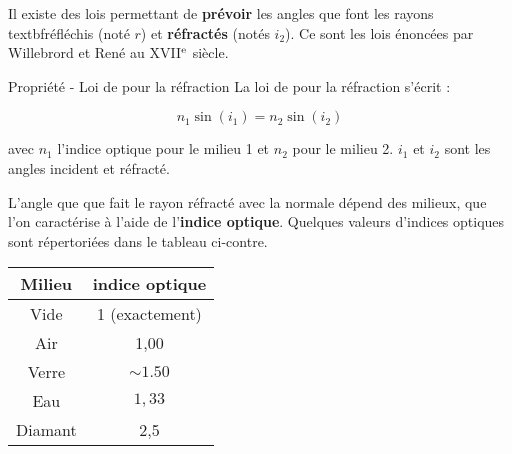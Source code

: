 \documentclass[french, a4paper, 12pt]{article}
\begin{document}
Il existe des lois permettant de \textbf{prévoir} les angles que font les rayons textbf{réfléchis} (noté $r$) et \textbf{réfractés} (notés $ i_{2}$). Ce sont les lois énoncées par Willebrord  et René  au XVII$^{\rm e}$ siècle.\medskip

\begin{minipage}{.6\textwidth}
\begin{Proposition}{Propriété - Loi de  pour la réfraction}
	La loi de  pour la réfraction s'écrit : 

	\begin{equation}
		n_1\sin(i_1) = n_2\sin(i_2)
	\end{equation}
	
	avec $n_1$ l'indice optique pour le milieu 1 et $n_2$ pour le milieu 2. $i_1$ et $i_2$ sont les angles incident et réfracté. 



\end{Proposition}

L'angle que que fait le rayon réfracté avec la normale dépend des milieux, que l'on caractérise à l'aide de l'\textbf{indice optique}. Quelques valeurs d'indices optiques sont répertoriées dans le tableau ci-contre.
\end{minipage}
\begin{minipage}{.4\textwidth}
	\centering
	\begin{tabular}{|c|c|}
		\hline
		\textbf{Milieu} & \textbf{indice optique} \\ \hline
		Vide  			& 1 (exactement) \\ \hline
		Air				& 1,00  \\ \hline
		Verre           & $\sim 1.50$ \\ \hline
		Eau				& $1,33$ \\ \hline
		Diamant 		& 2,5 \\ \hline
	\end{tabular}
\end{minipage}
\end{document}
